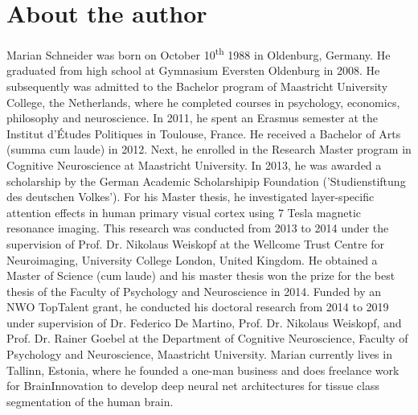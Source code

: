\chapter{About the author}
Marian Schneider was born on October 10\textsuperscript{th} 1988 in Oldenburg, Germany. He graduated from high school at Gymnasium Eversten Oldenburg in 2008. He subsequently was admitted to the Bachelor program of Maastricht University College, the Netherlands, where he completed courses in psychology, economics, philosophy and neuroscience. In 2011, he spent an Erasmus semester at the Institut d'\'Etudes Politiques in Toulouse, France. He received a Bachelor of Arts (summa cum laude) in 2012. Next, he enrolled in the Research Master program in Cognitive Neuroscience at Maastricht University. In 2013, he was awarded a scholarship by the German Academic Scholarshipip Foundation ('Studienstiftung des deutschen Volkes'). For his Master thesis, he investigated layer-specific attention effects in human primary visual cortex using 7 Tesla magnetic resonance imaging. This research was conducted from 2013 to 2014 under the supervision of Prof. Dr. Nikolaus Weiskopf at the Wellcome Trust Centre for Neuroimaging, University College London, United Kingdom. He obtained a Master of Science (cum laude) and his master thesis won the prize for the best thesis of the Faculty of Psychology and Neuroscience in 2014. Funded by an NWO TopTalent grant, he conducted his doctoral research from 2014 to 2019 under supervision of Dr. Federico De Martino, Prof. Dr. Nikolaus Weiskopf, and Prof. Dr. Rainer Goebel at the Department of Cognitive Neuroscience, Faculty of Psychology and Neuroscience, Maastricht University. Marian currently lives in Tallinn, Estonia, where he founded a one-man business and does freelance work for BrainInnovation to develop deep neural net architectures for tissue class segmentation of the human brain.